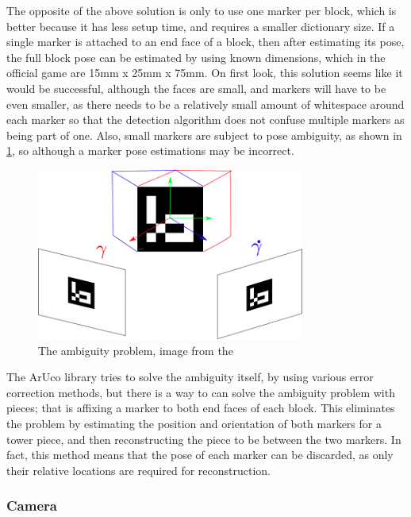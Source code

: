 The opposite of the above solution is only to use one marker per block, which is better because it has less setup time, and requires a smaller dictionary size. If a single marker is attached to an end face of a block, then after estimating its pose, the full block pose can be estimated by using known dimensions, which in the official game are 15mm x 25mm x 75mm. On first look, this solution seems like it would be successful, although the faces are small, and markers will have to be even smaller, as there needs to be a relatively small amount of whitespace around each marker so that the detection algorithm does not confuse multiple markers as being part of one. Also, small markers are subject to pose ambiguity, as shown in \cref{fig:poseambiguity}, so although a marker pose estimations may be incorrect.

\begin{figure}[ht]
\begin{minipage}{\textwidth}
    \centering
    \includegraphics{images/requirements/ambiguity_problem.png}
    \caption{The ambiguity problem, image from the \protect{}}
    \label{fig:poseambiguity}
\end{minipage}
\end{figure}

The ArUco library tries to solve the ambiguity itself, by using various error correction methods, but there is a way to can solve the ambiguity problem with \jenga{} pieces; that is affixing a marker to both end faces of each block. This eliminates the problem by estimating the position and orientation of both markers for a tower piece, and then reconstructing the piece to be between the two markers. In fact, this method means that the pose of each marker can be discarded, as only their relative locations are required for reconstruction.

\subsubsection{Camera}

